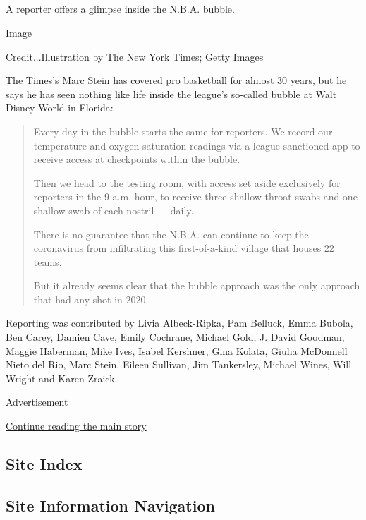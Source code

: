 \hypertarget{-11}{%
\subsection{}\label{-11}}

A reporter offers a glimpse inside the N.B.A. bubble.

Image

Credit...Illustration by The New York Times; Getty Images

The Times's Marc Stein has covered pro basketball for almost 30 years,
but he says he has seen nothing like
\href{https://www.nytimes3xbfgragh.onion/interactive/2020/08/04/sports/nba-bubble-coronavirus.html}{life
inside the league's so-called bubble} at Walt Disney World in Florida:

\begin{quote}
Every day in the bubble starts the same for reporters. We record our
temperature and oxygen saturation readings via a league-sanctioned app
to receive access at checkpoints within the bubble.

Then we head to the testing room, with access set aside exclusively for
reporters in the 9 a.m. hour, to receive three shallow throat swabs and
one shallow swab of each nostril --- daily.

There is no guarantee that the N.B.A. can continue to keep the
coronavirus from infiltrating this first-of-a-kind village that houses
22 teams.

But it already seems clear that the bubble approach was the only
approach that had any shot in 2020.
\end{quote}

Reporting was contributed by Livia Albeck-Ripka, Pam Belluck, Emma
Bubola, Ben Carey, Damien Cave, Emily Cochrane, Michael Gold, J. David
Goodman, Maggie Haberman, Mike Ives, Isabel Kershner, Gina Kolata,
Giulia McDonnell Nieto del Rio, Marc Stein, Eileen Sullivan, Jim
Tankersley, Michael Wines, Will Wright and Karen Zraick.

Advertisement

\protect\hyperlink{after-bottom}{Continue reading the main story}

\hypertarget{site-index}{%
\subsection{Site Index}\label{site-index}}

\hypertarget{site-information-navigation}{%
\subsection{Site Information
Navigation}\label{site-information-navigation}}

